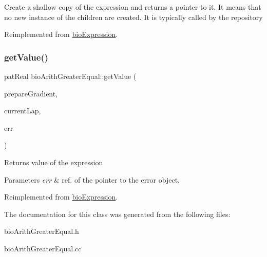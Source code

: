 Create a shallow copy of the expression and returns a pointer to it. It means that no new instance of the children are created. It is typically called by the repository 

Reimplemented from \hyperlink{classbio_expression_a442534762693b92baaf33928979a1bf8}{bio\+Expression}.

\mbox{\label{classbio_arith_greater_equal_ad9948d07e8c792d998fa6b6099b17633}} 
\subsubsection{\texorpdfstring{get\+Value()}{getValue()}}
{\footnotesize\ttfamily pat\+Real bio\+Arith\+Greater\+Equal\+::get\+Value (\begin{DoxyParamCaption}\item[{pat\+Boolean}]{prepare\+Gradient,  }\item[{pat\+U\+Long}]{current\+Lap,  }\item[{pat\+Error $\ast$\&}]{err }\end{DoxyParamCaption})\hspace{0.3cm}{\ttfamily [virtual]}}

\begin{DoxyReturn}{Returns}
value of the expression 
\end{DoxyReturn}

\begin{DoxyParams}{Parameters}
{\em err} & ref. of the pointer to the error object. \\
\hline
\end{DoxyParams}


Reimplemented from \hyperlink{classbio_expression_af58662a5d4d456f15bc4f2c9bd4f8a5b}{bio\+Expression}.



The documentation for this class was generated from the following files\+:\begin{DoxyCompactItemize}
\item 
bio\+Arith\+Greater\+Equal.\+h\item 
bio\+Arith\+Greater\+Equal.\+cc\end{DoxyCompactItemize}
